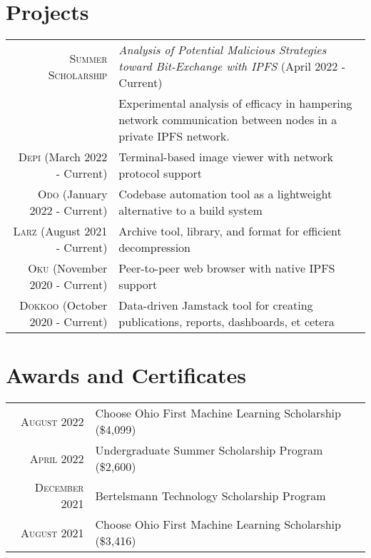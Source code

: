 \documentclass[a4paper,10pt]{article} %
\begin{document}

\section{Projects}

\begin{tabular}{rl}
\footnotesize\textsc{Summer Scholarship} & \footnotesize\emph{Analysis of Potential Malicious Strategies toward Bit-Exchange with IPFS} \footnotesize{(April 2022 - Current)}\\
& \footnotesize{Experimental analysis of efficacy in hampering network communication between nodes in a private IPFS network.}\\
\textsc{Depi} \footnotesize{(March 2022 - Current)} & Terminal-based image viewer with network protocol support\\
\textsc{Odo} \footnotesize{(January 2022 - Current)} & Codebase automation tool as a lightweight alternative to a build system\\
\textsc{Larz} \footnotesize{(August 2021 - Current)} & Archive tool, library, and format for efficient decompression\\
\textsc{Oku} \footnotesize{(November 2020 - Current)} & Peer-to-peer web browser with native IPFS support\\
\textsc{Dokkoo} \footnotesize{(October 2020 - Current)} & Data-driven Jamstack tool for creating publications, reports, dashboards, et cetera\\
\end{tabular}


\section{Awards and Certificates}

\footnotesize{\begin{tabular}{rl}
\textsc{August 2022} & Choose Ohio First Machine Learning Scholarship \footnotesize(\$4,099)\normalsize\\
\textsc{April 2022} & Undergraduate Summer Scholarship Program \footnotesize(\$2,600)\\
\textsc{December 2021} & Bertelsmann Technology Scholarship Program\\
\textsc{August 2021} & Choose Ohio First Machine Learning Scholarship \footnotesize(\$3,416)\normalsize\\
\end{tabular}}\normalsize
\end{document}
